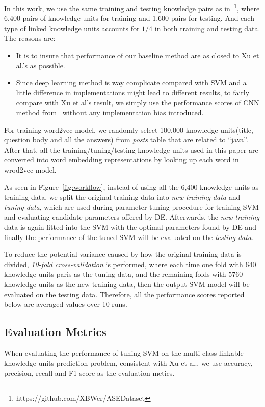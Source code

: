 \documentclass[sigconf,review, anonymous]{acmart}
\theoremstyle{break}
\newcommand{\bi}{\begin{itemize}[leftmargin=0.4cm]}
\newcommand{\ei}{\end{itemize}}
\newcommand{\fig}[1]{Figure~\ref{fig:#1}}
\begin{document}
In this work, we use the same training and testing
knowledge pairs as in~\cite{xu2016predicting}\footnote{https://github.com/XBWer/ASEDataset}, 
where 6,400 pairs of  knowledge units for training and 1,600 pairs for testing. And each type 
of linked knowledge units accounts for $1/4$ in both training and testing data. The reasons are:
\bi
\item It is to insure that  performance of our baseline method are as closed to Xu et al.'s as possible.
\item Since deep learning method is way complicate compared with SVM and a little difference in implementations
might lead to different results, to fairly compare with Xu et al's result, we simply use the  performance scores
of CNN method from~\cite{xu2016predicting} without any implementation bias introduced.
\ei

For training word2vec model, we randomly select 100,000 knowledge
 units(title, question body and all the answers) from {\it posts} table that are
 related to ``java''. After that, all the training/tuning/testing knowledge units
 used in this paper are converted into word embedding representations by looking up
 each word in wrod2vec model.
 
As seen in \fig{workflow}, instead of using all the 6,400 knowledge units as training data, 
we split the original training data into {\it new training data} and {\it tuning data}, which are
used during parameter tuning procedure for training SVM and evaluating candidate
parameters offered by DE. Afterwards, the {\it new training} data is again fitted into the SVM
with the optimal parameters found by DE and finally  the performance of the tuned
SVM will be evaluated on the  {\it testing data}.

To reduce the potential variance caused
by how the original training data is divided, {\it 10-fold cross-validation} is performed, where
each time one fold with $640$ knowledge units paris as the tuning data, and the remaining folds with $5760$
knowledge units as  the new training data, then the output SVM model will be evaluated on the testing data. Therefore,
all the performance scores reported below are averaged values over 10 runs.



\subsection{Evaluation Metrics}
When evaluating the performance of tuning SVM on the
multi-class linkable knowledge units prediction problem,
consistent with Xu et al.\cite{xu2016predicting}, we use accuracy, precision, recall and F1-score
as the evaluation metics.
\end{document}
